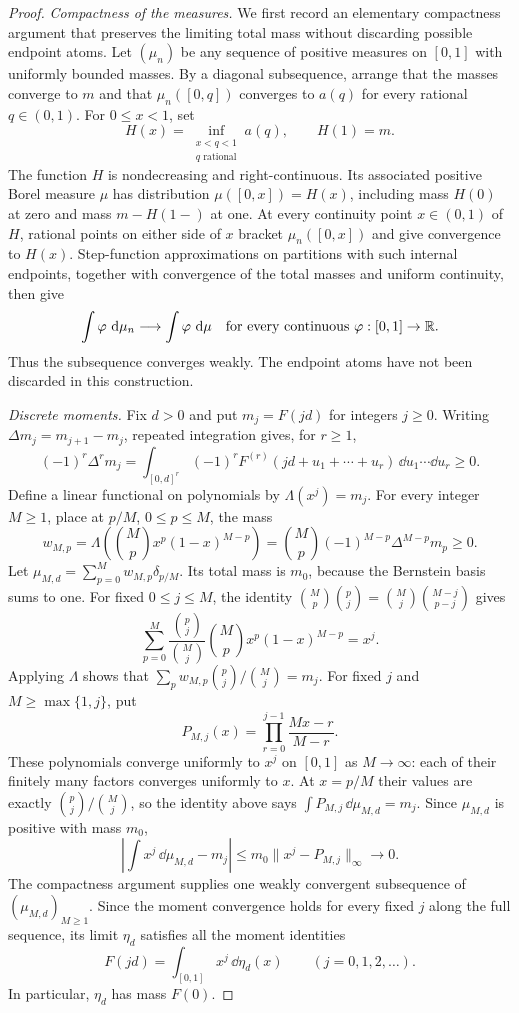 \begin{proof}
\emph{Compactness of the measures.}
We first record an elementary compactness argument that preserves the limiting
total mass without discarding possible endpoint atoms.  Let $(\mu_n)$ be any
sequence of positive measures on $[0,1]$ with
uniformly bounded masses.  By a diagonal subsequence, arrange that the masses
converge to $m$ and that $\mu_n([0,q])$ converges to $a(q)$ for every rational
$q\in(0,1)$.  For $0\le x<1$, set
\[
 H(x)=\inf_{\substack{x<q<1\\q\text{ rational}}}a(q),
 \qquad H(1)=m.
\]
The function $H$ is nondecreasing and right-continuous.  Its associated
positive Borel measure $\mu$ has distribution $\mu([0,x])=H(x)$, including
mass $H(0)$ at zero and mass $m-H(1-)$ at one.  At every continuity point
$x\in(0,1)$ of $H$, rational points on either side of $x$ bracket
$\mu_n([0,x])$ and give convergence to $H(x)$.  Step-function approximations
on partitions with such internal endpoints, together with convergence of
the total masses and uniform continuity, then give
\[
 \int\varphi\,\mathop{}\!\mathrm d\mu_n\longrightarrow\int\varphi\,\mathop{}\!\mathrm d\mu
 \quad\text{for every continuous }\varphi:[0,1]\to\mathbb R.
\]
Thus the subsequence converges weakly.  The endpoint atoms have not been
discarded in this construction.

\emph{Discrete moments.}
Fix $d>0$ and put $m_j=F(jd)$ for integers $j\ge0$.
Writing $\Delta m_j=m_{j+1}-m_j$, repeated integration gives, for $r\ge1$,
\[
 (-1)^r\Delta^r m_j
 =\int_{[0,d]^r}(-1)^r F^{(r)}(jd+u_1+\cdots+u_r)
       \,\dd u_1\cdots\dd u_r\ge0.
\]
Define a linear functional on polynomials by $\Lambda(x^j)=m_j$.
For every integer $M\ge1$, place at $p/M$, $0\le p\le M$, the mass
\[
 w_{M,p}=\Lambda\!\left(\binom Mp x^p(1-x)^{M-p}\right)
 =\binom Mp(-1)^{M-p}\Delta^{M-p}m_p\ge0.
\]
Let $\mu_{M,d}=\sum_{p=0}^M w_{M,p}\delta_{p/M}$.  Its total mass is
$m_0$, because the Bernstein basis sums to one.  For fixed
$0\le j\le M$, the identity
$\binom Mp\binom pj=\binom Mj\binom{M-j}{p-j}$ gives
\[
 \sum_{p=0}^M\frac{\binom pj}{\binom Mj}
       \binom Mp x^p(1-x)^{M-p}=x^j.
\]
Applying $\Lambda$ shows that
$\sum_p w_{M,p}\binom pj/\binom Mj=m_j$.
For fixed $j$ and $M\ge\max\{1,j\}$, put
\[
 P_{M,j}(x)=\prod_{r=0}^{j-1}\frac{Mx-r}{M-r}.
\]
These polynomials converge uniformly to $x^j$ on $[0,1]$ as $M\to\infty$:
each of their finitely many factors converges uniformly to $x$.  At
$x=p/M$ their values are exactly $\binom pj/\binom Mj$, so the identity
above says $\int P_{M,j}\,\dd\mu_{M,d}=m_j$.  Since $\mu_{M,d}$ is
positive with mass $m_0$,
\[
 \left|\int x^j\,\dd\mu_{M,d}-m_j\right|
 \le m_0\|x^j-P_{M,j}\|_\infty\longrightarrow0.
\]
The compactness argument supplies one weakly convergent subsequence of
$(\mu_{M,d})_{M\ge1}$.  Since the moment convergence holds for every
fixed $j$ along the full sequence, its limit $\eta_d$ satisfies all the moment identities
\[
 F(jd)=\int_{[0,1]}x^j\,\dd\eta_d(x)
 \qquad(j=0,1,2,\ldots).
\]
In particular, $\eta_d$ has mass $F(0)$.


\end{proof}
